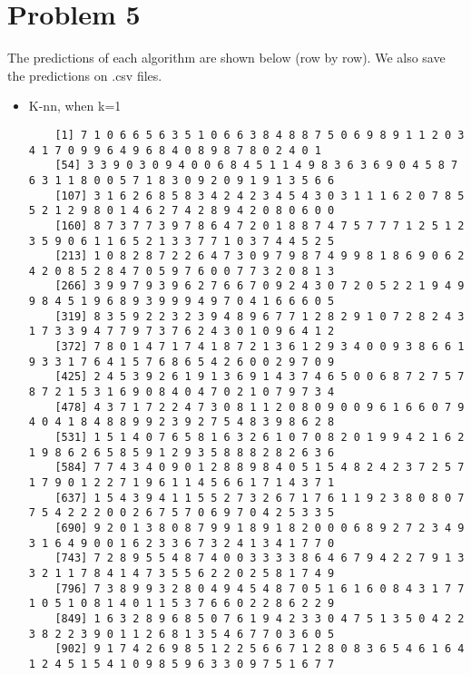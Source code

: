 \documentclass{article}
\begin{document}
\section{Problem 5}
The predictions of each algorithm are shown below (row by row). We also save the predictions on .csv files. 
\begin{itemize}
	\item K-nn, when k=1\\
	\begin{scriptsize}

	
	
	\begin{verbatim}
	[1] 7 1 0 6 6 5 6 3 5 1 0 6 6 3 8 4 8 8 7 5 0 6 9 8 9 1 1 2 0 3 4 1 7 0 9 9 6 4 9 6 8 4 0 8 9 8 7 8 0 2 4 0 1
	[54] 3 3 9 0 3 0 9 4 0 0 6 8 4 5 1 1 4 9 8 3 6 3 6 9 0 4 5 8 7 6 3 1 1 8 0 0 5 7 1 8 3 0 9 2 0 9 1 9 1 3 5 6 6
	[107] 3 1 6 2 6 8 5 8 3 4 2 4 2 3 4 5 4 3 0 3 1 1 1 6 2 0 7 8 5 5 2 1 2 9 8 0 1 4 6 2 7 4 2 8 9 4 2 0 8 0 6 0 0
	[160] 8 7 3 7 7 3 9 7 8 6 4 7 2 0 1 8 8 7 4 7 5 7 7 7 1 2 5 1 2 3 5 9 0 6 1 1 6 5 2 1 3 3 7 7 1 0 3 7 4 4 5 2 5
	[213] 1 0 8 2 8 7 2 2 6 4 7 3 0 9 7 9 8 7 4 9 9 8 1 8 6 9 0 6 2 4 2 0 8 5 2 8 4 7 0 5 9 7 6 0 0 7 7 3 2 0 8 1 3
	[266] 3 9 9 7 9 3 9 6 2 7 6 6 7 0 9 2 4 3 0 7 2 0 5 2 2 1 9 4 9 9 8 4 5 1 9 6 8 9 3 9 9 9 4 9 7 0 4 1 6 6 6 0 5
	[319] 8 3 5 9 2 2 3 2 3 9 4 8 9 6 7 7 1 2 8 2 9 1 0 7 2 8 2 4 3 1 7 3 3 9 4 7 7 9 7 3 7 6 2 4 3 0 1 0 9 6 4 1 2
	[372] 7 8 0 1 4 7 1 7 4 1 8 7 2 1 3 6 1 2 9 3 4 0 0 9 3 8 6 6 1 9 3 3 1 7 6 4 1 5 7 6 8 6 5 4 2 6 0 0 2 9 7 0 9
	[425] 2 4 5 3 9 2 6 1 9 1 3 6 9 1 4 3 7 4 6 5 0 0 6 8 7 2 7 5 7 8 7 2 1 5 3 1 6 9 0 8 4 0 4 7 0 2 1 0 7 9 7 3 4
	[478] 4 3 7 1 7 2 2 4 7 3 0 8 1 1 2 0 8 0 9 0 0 9 6 1 6 6 0 7 9 4 0 4 1 8 4 8 8 9 9 2 3 9 2 7 5 4 8 3 9 8 6 2 8
	[531] 1 5 1 4 0 7 6 5 8 1 6 3 2 6 1 0 7 0 8 2 0 1 9 9 4 2 1 6 2 1 9 8 6 2 6 5 8 5 9 1 2 9 3 5 8 8 8 2 8 2 6 3 6
	[584] 7 7 4 3 4 0 9 0 1 2 8 8 9 8 4 0 5 1 5 4 8 2 4 2 3 7 2 5 7 1 7 9 0 1 2 2 7 1 9 6 1 1 4 5 6 6 1 7 1 4 3 7 1
	[637] 1 5 4 3 9 4 1 1 5 5 2 7 3 2 6 7 1 7 6 1 1 9 2 3 8 0 8 0 7 7 5 4 2 2 2 0 0 2 6 7 5 7 0 6 9 7 0 4 2 5 3 3 5
	[690] 9 2 0 1 3 8 0 8 7 9 9 1 8 9 1 8 2 0 0 0 6 8 9 2 7 2 3 4 9 3 1 6 4 9 0 0 1 6 2 3 3 6 7 3 2 4 1 3 4 1 7 7 0
	[743] 7 2 8 9 5 5 4 8 7 4 0 0 3 3 3 3 8 6 4 6 7 9 4 2 2 7 9 1 3 3 2 1 1 7 8 4 1 4 7 3 5 5 6 2 2 0 2 5 8 1 7 4 9
	[796] 7 3 8 9 9 3 2 8 0 4 9 4 5 4 8 7 0 5 1 6 1 6 0 8 4 3 1 7 7 1 0 5 1 0 8 1 4 0 1 1 5 3 7 6 6 0 2 2 8 6 2 2 9
	[849] 1 6 3 2 8 9 6 8 5 0 7 6 1 9 4 2 3 3 0 4 7 5 1 3 5 0 4 2 2 3 8 2 2 3 9 0 1 1 2 6 8 1 3 5 4 6 7 7 0 3 6 0 5
	[902] 9 1 7 4 2 6 9 8 5 1 2 2 5 6 6 7 1 2 8 0 8 3 6 5 4 6 1 6 4 1 2 4 5 1 5 4 1 0 9 8 5 9 6 3 3 0 9 7 5 1 6 7 7

\end{verbatim}
\end{scriptsize}
\end{itemize}
\end{document}
